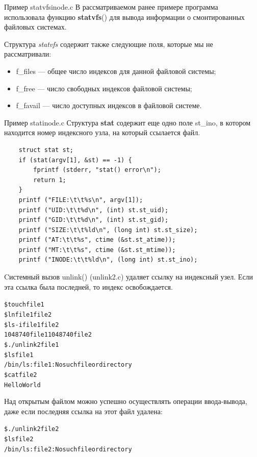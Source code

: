 \documentclass[xcolor=table]{beamer}
\begin{document}
\begin{frame}[fragile]{Пример statvfsinode.c}
	В рассматриваемом ранее примере программа использовала функцию \textbf{statvfs}() для вывода информации о смонтированных файловых системах. 

	Структура \textit{statvfs} содержит также следующие поля, которые мы не рассматривали:
	\begin{itemize}
		\item f\_files — общее число индексов для данной файловой системы;
		\item f\_free — число свободных индексов файловой системы;
		\item f\_favail — число доступных индексов в файловой системе.
	\end{itemize}
\end{frame}

\begin{frame}[fragile]{Пример statinode.c}
	Структура \textbf{stat} содержит еще одно поле st\_ino, в котором находится номер индексного узла, на который ссылается файл.
	\begin{verbatim}
    struct stat st;
    if (stat(argv[1], &st) == -1) {
        fprintf (stderr, "stat() error\n");
        return 1;
    }
    printf ("FILE:\t\t%s\n", argv[1]);
    printf ("UID:\t\t%d\n", (int) st.st_uid);
    printf ("GID:\t\t%d\n", (int) st.st_gid);
    printf ("SIZE:\t\t%ld\n", (long int) st.st_size);
    printf ("AT:\t\t%s", ctime (&st.st_atime));
    printf ("MT:\t\t%s", ctime (&st.st_mtime));
    printf ("INODE:\t\t%ld\n", (long int) st.st_ino);
	\end{verbatim}
\end{frame}

\begin{frame}[fragile]
	Cистемный вызов unlink() (unlink2.c) удаляет ссылку на индексный узел. Если эта ссылка была последней, то индекс освобождается.
	\begin{alltt}
		\$ touch file1
		\$ ln file1 file2
		\$ ls -i file1 file2
		1048740 file1 1048740 file2
		\$ ./unlink2 file1
		\$ ls file1
		/bin/ls: file1: No such file or directory
		\$ cat file2
		Hello World
	\end{alltt}
	Над открытым файлом можно успешно осуществлять операции ввода-вывода, даже если последняя ссылка на этот файл удалена:
	\begin{alltt}
		\$ ./unlink2 file2
		\$ ls file2
		/bin/ls: file2: No such file or directory
	\end{alltt}
\end{frame}
\end{document}
